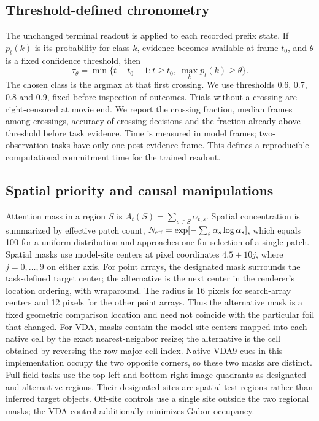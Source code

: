 \documentclass[11pt]{article}
\begin{document}
\subsection{Threshold-defined chronometry}
The unchanged terminal readout is applied to each recorded prefix state. If $p_t(k)$ is its probability for class $k$, evidence becomes available at frame $t_0$, and $\theta$ is a fixed confidence threshold, then
\begin{equation}
 \tau_\theta=\min\{t-t_0+1:t\geq t_0,\ \max_k p_t(k)\geq\theta\}.
\end{equation}
The chosen class is the argmax at that first crossing. We use thresholds 0.6, 0.7, 0.8 and 0.9, fixed before inspection of outcomes. Trials without a crossing are right-censored at movie end. We report the crossing fraction, median frames among crossings, accuracy of crossing decisions and the fraction already above threshold before task evidence. Time is measured in model frames; two-observation tasks have only one post-evidence frame. This defines a reproducible computational commitment time for the trained readout.

\subsection{Spatial priority and causal manipulations}
Attention mass in a region $S$ is $A_t(S)=\sum_{s\in S}\alpha_{t,s}$. Spatial concentration is summarized by effective patch count, $N_{\rm eff}=\exp[-\sum_s\alpha_s\log\alpha_s]$, which equals 100 for a uniform distribution and approaches one for selection of a single patch. Spatial masks use model-site centers at pixel coordinates $4.5+10j$, where $j=0,\ldots,9$ on either axis. For point arrays, the designated mask surrounds the task-defined target center; the alternative is the next center in the renderer's location ordering, with wraparound. The radius is 16 pixels for search-array centers and 12 pixels for the other point arrays. Thus the alternative mask is a fixed geometric comparison location and need not coincide with the particular foil that changed. For VDA, masks contain the model-site centers mapped into each native cell by the exact nearest-neighbor resize; the alternative is the cell obtained by reversing the row-major cell index. Native VDA9 cues in this implementation occupy the two opposite corners, so these two masks are distinct. Full-field tasks use the top-left and bottom-right image quadrants as designated and alternative regions. Their designated sites are spatial test regions rather than inferred target objects. Off-site controls use a single site outside the two regional masks; the VDA control additionally minimizes Gabor occupancy.
\end{document}
